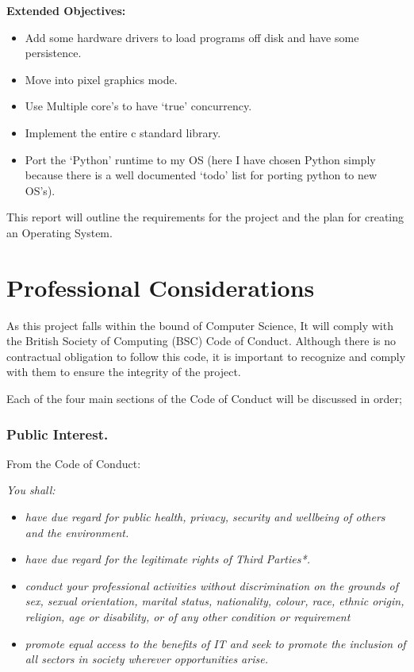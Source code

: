 \documentclass[a4paper]{report}
\begin{document}
\textbf {Extended Objectives:}


\begin{itemize}
\item Add some hardware drivers to load programs off disk and have some persistence.
\item Move into pixel graphics mode.
\item Use Multiple core's to have `true' concurrency.
\item Implement the entire c standard library.
\item Port the `Python' runtime to my OS (here I have chosen Python simply because there is a well documented `todo' list for porting python to new OS's).
\end{itemize}



This report will outline the requirements for the project and the plan for creating an Operating System.

\chapter*{Professional Considerations}

As this project falls within the bound of Computer Science, It will comply with the British Society of Computing (BSC) Code of Conduct. Although there is no contractual obligation to follow this code, it is important to recognize and comply with them to ensure the integrity of the project.

Each of the four main sections of the Code of Conduct will be discussed in order;

\subsection*{Public Interest.}

From the Code of Conduct: \cite{CoC}

\textit{You shall:}
\begin{itemize}
\item \textit{have due regard for public health, privacy, security and wellbeing of others and the environment.}
\item \textit{have due regard for the legitimate rights of Third Parties*.}
\item \textit{conduct your professional activities without discrimination on the grounds of sex, sexual orientation, marital status, nationality, colour, race, ethnic origin, religion, age or disability, or of any other condition or requirement }
\item \textit{promote equal access to the benefits of IT and seek to promote the inclusion of all sectors in society wherever opportunities arise.}
\end{itemize}
\end{document}
